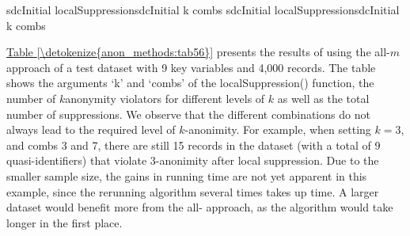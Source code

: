 \documentclass[letterpaper,10pt,english]{sphinxmanual}
\begin{document}
\def\sphinxLiteralBlockLabel{\label{\detokenize{anon_methods:code58}}}
%
\begin{sphinxVerbatim}[commandchars=\\\{\},numbers=left,firstnumber=1,stepnumber=1]
 sdcInitial  localSuppressionsdcInitial k   combs   
 sdcInitial  localSuppressionsdcInitial k    combs   
\end{sphinxVerbatim}

\hyperref[\detokenize{anon_methods:tab56}]{Table \ref{\detokenize{anon_methods:tab56}}} presents the results of using the all-\(m\) approach of
a test dataset with 9 key variables and 4,000 records. The table shows
the arguments ‘k’ and ‘combs’ of the localSuppression() function, the
number of \(k\)\sphinxstyleemphasis{-}anonymity violators for different levels of
\(k\) as well as the total number of suppressions. We observe that
the different combinations do not always lead to the required level of
\(k\)-anonimity. For example, when setting \(k = 3\), and combs
3 and 7, there are still 15 records in the dataset (with a total of 9
quasi-identifiers) that violate 3-anonimity after local suppression. Due
to the smaller sample size, the gains in running time are not yet
apparent in this example, since the rerunning algorithm several times
takes up time. A larger dataset would benefit more from the all-
approach, as the algorithm would take longer in the first place.
\end{document}
